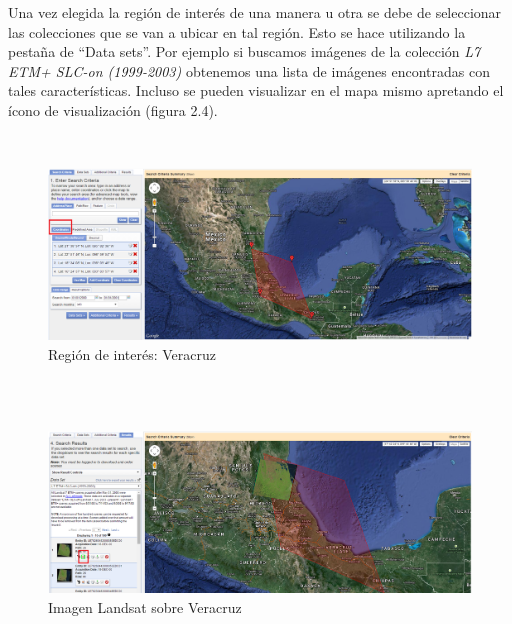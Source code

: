 Una vez elegida la región de interés de una manera u otra se debe de seleccionar las colecciones que se van a ubicar en tal región. Esto se hace utilizando la pestaña de "`Data sets"'. Por ejemplo si buscamos imágenes de la colección \textit{L7 ETM+ SLC-on (1999-2003)} obtenemos una lista de imágenes encontradas con tales características. Incluso se pueden visualizar en el mapa mismo apretando el ícono de visualización (figura 2.4). 

\newpage

\\

\begin{figure}[h!]
\begin{center}
\leavevmode
\includegraphics[width=6in]{7_veracruz.png}
\end{center}
\caption{Región de interés: Veracruz}
\end{figure}

\\



\\

\begin{figure}[h!]
\begin{center}
\leavevmode
\includegraphics[width=6in]{8_overlay.png}
\end{center}
\caption{Imagen Landsat sobre Veracruz}
\end{figure}

\\

